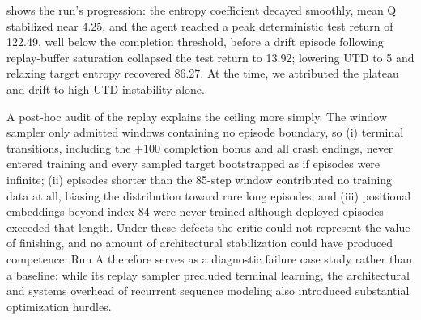 \documentclass[conference]{IEEEtran}
\begin{document}
\begin{table}[!t]
\centering
\caption{Quantitative progress metrics across training steps (TrackMania 2020, visual configuration, single run).}
\label{tab:epoch_progress}
\end{table}

 shows the run's progression: the entropy coefficient decayed smoothly, mean Q stabilized near 4.25, and the agent reached a peak deterministic test return of 122.49, well below the completion threshold, before a drift episode following replay-buffer saturation collapsed the test return to 13.92; lowering UTD to 5 and relaxing target entropy recovered 86.27. At the time, we attributed the plateau and drift to high-UTD instability alone.

A post-hoc audit of the replay explains the ceiling more simply. The window sampler only admitted windows containing no episode boundary, so (i) terminal transitions, including the $+100$ completion bonus and all crash endings, never entered training and every sampled target bootstrapped as if episodes were infinite; (ii) episodes shorter than the 85-step window contributed no training data at all, biasing the distribution toward rare long episodes; and (iii) positional embeddings beyond index 84 were never trained although deployed episodes exceeded that length. Under these defects the critic could not represent the value of finishing, and no amount of architectural stabilization could have produced competence. Run A therefore serves as a diagnostic failure case study rather than a baseline: while its replay sampler precluded terminal learning, the architectural and systems overhead of recurrent sequence modeling also introduced substantial optimization hurdles.
\end{document}

